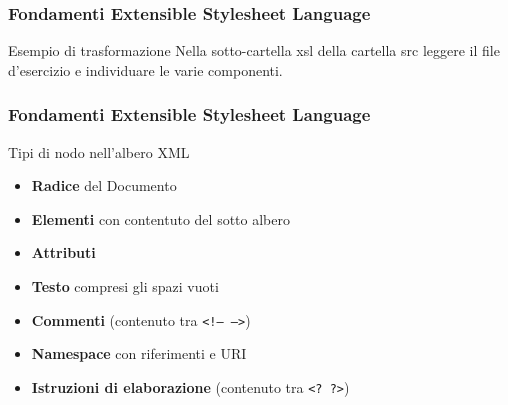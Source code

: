 \begin{frame}
    \frametitle{Fondamenti Extensible Stylesheet Language}
    \addtocounter{nframe}{1}
    

     \begin{block}{Esempio di trasformazione}
         Nella sotto-cartella xsl della cartella src leggere il file d'esercizio e individuare le varie componenti.
     \end{block}
    
\end{frame}

\begin{frame}
    \frametitle{Fondamenti Extensible Stylesheet Language}
    \addtocounter{nframe}{1}
    

     \begin{block}{Tipi di nodo nell'albero XML}
         \begin{itemize}
            \item \textbf{Radice} del Documento
            \item \textbf{Elementi} con contentuto del sotto albero
            \item \textbf{Attributi}
            \item \textbf{Testo} compresi gli spazi vuoti
            \item \textbf{Commenti} (contenuto tra \texttt{<!-- -->})
            \item \textbf{Namespace} con riferimenti e URI
            \item \textbf{Istruzioni di elaborazione} (contenuto tra \texttt{<? ?>})
        \end{itemize}
     \end{block}
    
\end{frame}

